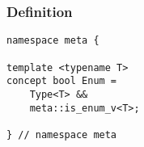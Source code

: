 
\subsubsection{Definition}

\begin{verbatim}
namespace meta {

template <typename T>
concept bool Enum =
	Type<T> &&
	meta::is_enum_v<T>;

} // namespace meta
\end{verbatim}
